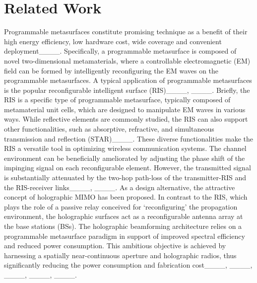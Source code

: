 \section{Related Work}
Programmable metasurfaces constitute promising technique as a benefit of their high energy efficiency, low hardware cost, wide coverage and convenient deployment____. Specifically, a programmable metasurface is composed of novel two-dimensional metamaterials, where a controllable electromagnetic (EM) field can be formed by intelligently reconfiguring the EM waves on the programmable metasurfaces. A typical application of programmable metasurfaces is the popular reconfigurable intelligent surface (RIS)____, ____. Briefly, the RIS is a specific type of programmable metasurface, typically composed of metamaterial unit cells, which are designed to manipulate EM waves in various ways. While reflective elements are commonly studied, the RIS can also support other functionalities, such as absorptive, refractive, and simultaneous transmission and reflection (STAR)____. These diverse functionalities make the RIS a versatile tool in optimizing wireless communication systems. The channel environment can be beneficially ameliorated by adjusting the phase shift of the impinging signal on each reconfigurable element. However, the transmitted signal is substantially attenuated by the two-hop path-loss of the transmitter-RIS and the RIS-receiver links____, ____. As a design alternative, the attractive concept of holographic MIMO has been proposed. In contrast to the RIS, which plays the role of a passive relay conceived for `reconfiguring' the propagation environment, the holographic surfaces act as a reconfigurable antenna array at the base stations (BSs). The holographic beamforming architecture relies on a programmable metasurface paradigm in support of improved spectral efficiency and reduced power consumption. This ambitious objective is achieved by harnessing a spatially near-continuous aperture and holographic radios, thus significantly reducing the power consumption and fabrication cost____, ____, ____, ____, ____.

